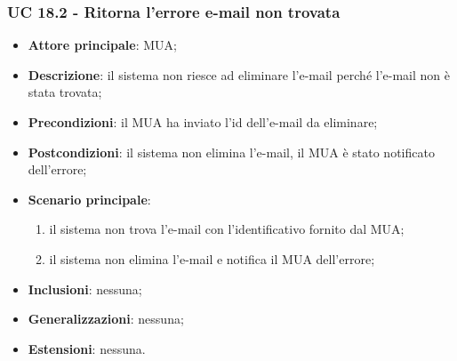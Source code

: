 \subsubsection{UC 18.2 - Ritorna l'errore e-mail non trovata} \label{sec:UC18.2}
    \begin{itemize}
        \item \textbf{Attore principale}: MUA;
        \item \textbf{Descrizione}: il sistema non riesce ad eliminare l'e-mail perché l'e-mail non è stata trovata;
        \item \textbf{Precondizioni}: il MUA ha inviato l'id dell'e-mail da eliminare;
        \item \textbf{Postcondizioni}: il sistema non elimina l'e-mail, il MUA è stato notificato dell'errore;
        \item \textbf{Scenario principale}:
            \begin{enumerate}
                \item il sistema non trova l'e-mail con l'identificativo fornito dal MUA;
                \item il sistema non elimina l'e-mail e notifica il MUA dell'errore;
            \end{enumerate}
        \item \textbf{Inclusioni}: nessuna;
        \item \textbf{Generalizzazioni}: nessuna;
        \item \textbf{Estensioni}: nessuna.
    \end{itemize}
